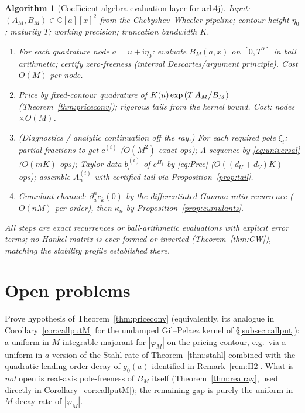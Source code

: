 \documentclass{article}
\newcommand{\tmem}[1]{{\em #1\/}}
\newcommand{\tmtextup}[1]{\text{{\upshape{#1}}}}
\newtheorem{algorithm}{Algorithm}
\newcommand{\C}{\mathbb{C}}
\begin{document}
\begin{algorithm}
  [Coefficient-algebra evaluation layer for arb4j]\label{alg:arb4j} Input:
  $(A_M, B_M) \in \C [a] [x]^2$ from the Chebyshev--Wheeler pipeline; contour
  height $\eta_0$; maturity $T$; working precision; truncation bandwidth $K$.
  \begin{enumerate}
    \item For each quadrature node $a = u + \mathrm{i} \eta_0$: evaluate $B_M 
    (a, x)$ on $[0, T^{\alpha}]$ in ball arithmetic; certify zero-freeness
    (interval Descartes/argument principle). Cost $O (M)$ per node.
    
    \item Price by fixed-contour quadrature of $K (u) \exp \left( T
    \hspace{0.17em} A_M / B_M \right)$ (Theorem~\ref{thm:priceconv}); rigorous
    tails from the kernel bound. Cost: nodes $\times O (M)$.
    
    \item (Diagnostics / analytic continuation off the ray.) For each required
    pole $\xi_i$: partial fractions to get $c^{(i)}$ ($O (M^2)$ exact ops);
    $\Lambda$-sequence by \eqref{eq:universal} ($O (mK)$ ops); Taylor data
    $b^{(i)}_l$ of $e^{H_i}$ by \eqref{eq:Prec} ($O ((d_U + d_V) K)$ ops);
    assemble $A^{(i)}_n$ with certified tail via Proposition~\ref{prop:tail}.
    
    \item Cumulant channel: $\partial_a^n c_k (0)$ by the differentiated
    Gamma-ratio recurrence ($O (nM)$ per order), then $\kappa_n$ by
    Proposition~\ref{prop:cumulants}.
  \end{enumerate}
  All steps are exact recurrences or ball-arithmetic evaluations with explicit
  error terms; no Hankel matrix is ever formed or inverted (Theorem~\ref{thm:CW}),
  matching the stability profile established there.
\end{algorithm}

\section{Open problems}\label{sec:open}

\begin{problem}
  [Domination]\label{prob:H2} Prove hypothesis \tmtextup{(H2)} of
  Theorem~\ref{thm:priceconv} (equivalently, its analogue in
  Corollary~\ref{cor:callputM} for the undamped Gil--Pelaez kernel of
  \S\ref{subsec:callput}): a uniform-in-$M$ integrable majorant for $|
  \varphi_M |$ on the pricing contour, e.g.\ via a uniform-in-$a$ version of
  the Stahl rate of Theorem~\ref{thm:stahl} combined with the quadratic
  leading-order decay of $g_0 (a)$ identified in Remark~\ref{rem:H2}. What is
  {\tmem{not}} open is real-axis pole-freeness of $B_M$ itself
  (Theorem~\ref{thm:realray}, used directly in Corollary~\ref{cor:callputM});
  the remaining gap is purely the uniform-in-$M$ decay rate of $| \varphi_M
  |$.
\end{problem}
\end{document}
